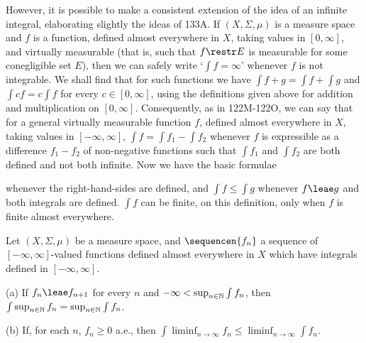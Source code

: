  However, it is possible to make a consistent
extension of the idea of an infinite integral, elaborating slightly the
ideas of 133A.   If $(X,\Sigma,\mu)$ is a measure space and $f$ is a
function, defined almost everywhere in $X$, taking values in
$[0,\infty]$, and virtually measurable (that is, such that $f\restr E$
is measurable for some
conegligible set $E$), then we can safely write `$\int f=\infty$'
whenever $f$ is not integrable.   We shall find that for such functions
we have $\int f+g=\int f+\int g$ and $\int cf=c\int f$ for every
$c\in[0,\infty]$, using the definitions given above for addition and
multiplication on $[0,\infty]$.   Consequently, as in
122M-122O, %
we can say that for a general virtually measurable function $f$, defined
almost everywhere in $X$,
taking values in $[-\infty,\infty]$, $\int f=\int f_1-\int f_2$
whenever $f$ is expressible as a difference $f_1-f_2$ of non-negative
functions such that $\int f_1$ and $\int f_2$ are both defined and not
both infinite.   Now we have the basic formulae


\noindent whenever the right-hand-sides are defined, and
$\int f\le\int g$ whenever $f\leae g$ and both integrals are defined.
 $\int f$ can be finite, on this
definition, only when $f$ is finite almost everywhere.

 Let $(X,\Sigma,\mu)$ be a measure space, and
$\sequencen{f_n}$ a sequence of $[-\infty,\infty]$-valued functions
defined almost everywhere in $X$ which have integrals defined in
$[-\infty,\infty]$.

(a) If $f_n\leae f_{n+1}$ for every $n$ and
$-\infty<\sup_{n\in\Bbb N}\int f_n$, then
$\int\sup_{n\in\Bbb N}f_n=\sup_{n\in\Bbb N}\int f_n$.

(b) If, for each $n$, $f_n\ge 0$ a.e., then
$\int\liminf_{n\to\infty}f_n\le\liminf_{n\to\infty}\int f_n$.


